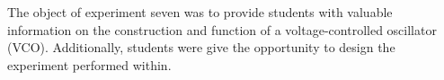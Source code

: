 The object of experiment seven was to provide students with valuable information on the construction and function of a voltage-controlled oscillator (VCO).  Additionally, students were give the opportunity to design the experiment performed within.
